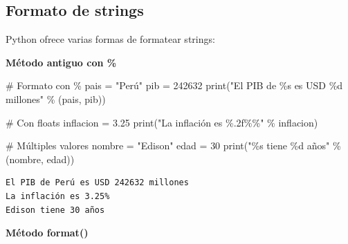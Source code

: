 \documentclass[
  doc,
  floatsintext,
  longtable,
  a4paper,
  nolmodern,
  notxfonts,
  notimes,
  12pt,
  colorlinks=true,linkcolor=blue,citecolor=blue,urlcolor=blue]{apa7}
\newenvironment{Shaded}{\begin{snugshade}}{\end{snugshade}}
\newcommand{\BuiltInTok}[1]{\textcolor[rgb]{0.00,0.23,0.31}{#1}}
\newcommand{\CommentTok}[1]{\textcolor[rgb]{0.37,0.37,0.37}{#1}}
\newcommand{\DecValTok}[1]{\textcolor[rgb]{0.68,0.00,0.00}{#1}}
\newcommand{\FloatTok}[1]{\textcolor[rgb]{0.68,0.00,0.00}{#1}}
\newcommand{\NormalTok}[1]{\textcolor[rgb]{0.00,0.23,0.31}{#1}}
\newcommand{\OperatorTok}[1]{\textcolor[rgb]{0.37,0.37,0.37}{#1}}
\newcommand{\SpecialCharTok}[1]{\textcolor[rgb]{0.37,0.37,0.37}{#1}}
\newcommand{\StringTok}[1]{\textcolor[rgb]{0.13,0.47,0.30}{#1}}
\begin{document}
\subsection{Formato de strings}\label{formato-de-strings}

Python ofrece varias formas de formatear strings:

\textbf{Método antiguo con \%}

\begin{Shaded}
\begin{Highlighting}[]
\CommentTok{\# Formato con \%}
\NormalTok{pais }\OperatorTok{=} \StringTok{"Perú"}
\NormalTok{pib }\OperatorTok{=} \DecValTok{242632}
\BuiltInTok{print}\NormalTok{(}\StringTok{"El PIB de }\SpecialCharTok{\%s}\StringTok{ es USD }\SpecialCharTok{\%d}\StringTok{ millones"} \OperatorTok{\%}\NormalTok{ (pais, pib))}

\CommentTok{\# Con floats}
\NormalTok{inflacion }\OperatorTok{=} \FloatTok{3.25}
\BuiltInTok{print}\NormalTok{(}\StringTok{"La inflación es }\SpecialCharTok{\%.2f\%\%}\StringTok{"} \OperatorTok{\%}\NormalTok{ inflacion)}

\CommentTok{\# Múltiples valores}
\NormalTok{nombre }\OperatorTok{=} \StringTok{"Edison"}
\NormalTok{edad }\OperatorTok{=} \DecValTok{30}
\BuiltInTok{print}\NormalTok{(}\StringTok{"}\SpecialCharTok{\%s}\StringTok{ tiene }\SpecialCharTok{\%d}\StringTok{ años"} \OperatorTok{\%}\NormalTok{ (nombre, edad))}
\end{Highlighting}
\end{Shaded}

\begin{verbatim}
El PIB de Perú es USD 242632 millones
La inflación es 3.25%
Edison tiene 30 años
\end{verbatim}

\textbf{Método format()}
\end{document}
